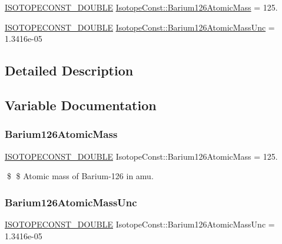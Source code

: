 \begin{DoxyCompactItemize}
\item 
\mbox{\hyperlink{group___isotope_const-_macros_ga8f45a7272ce02c0b4c65c44636ed719a}{I\+S\+O\+T\+O\+P\+E\+C\+O\+N\+S\+T\+\_\+\+D\+O\+U\+B\+LE}} \mbox{\hyperlink{group___isotope_const-_barium-_ba126_ga45bf82730a0cc1ddb43e79e016e80d28}{Isotope\+Const\+::\+Barium126\+Atomic\+Mass}} = 125.
\item 
\mbox{\hyperlink{group___isotope_const-_macros_ga8f45a7272ce02c0b4c65c44636ed719a}{I\+S\+O\+T\+O\+P\+E\+C\+O\+N\+S\+T\+\_\+\+D\+O\+U\+B\+LE}} \mbox{\hyperlink{group___isotope_const-_barium-_ba126_gaaa673860e5bdba2563afba2136b3dc9f}{Isotope\+Const\+::\+Barium126\+Atomic\+Mass\+Unc}} = 1.\+3416e-\/05
\end{DoxyCompactItemize}


\subsection{Detailed Description}


\subsection{Variable Documentation}
\mbox{\label{group___isotope_const-_barium-_ba126_ga45bf82730a0cc1ddb43e79e016e80d28}} 
\subsubsection{\texorpdfstring{Barium126\+Atomic\+Mass}{Barium126AtomicMass}}
{\footnotesize\ttfamily \mbox{\hyperlink{group___isotope_const-_macros_ga8f45a7272ce02c0b4c65c44636ed719a}{I\+S\+O\+T\+O\+P\+E\+C\+O\+N\+S\+T\+\_\+\+D\+O\+U\+B\+LE}} Isotope\+Const\+::\+Barium126\+Atomic\+Mass = 125.}

\$ \$ Atomic mass of Barium-\/126 in amu. \mbox{\label{group___isotope_const-_barium-_ba126_gaaa673860e5bdba2563afba2136b3dc9f}} 
\subsubsection{\texorpdfstring{Barium126\+Atomic\+Mass\+Unc}{Barium126AtomicMassUnc}}
{\footnotesize\ttfamily \mbox{\hyperlink{group___isotope_const-_macros_ga8f45a7272ce02c0b4c65c44636ed719a}{I\+S\+O\+T\+O\+P\+E\+C\+O\+N\+S\+T\+\_\+\+D\+O\+U\+B\+LE}} Isotope\+Const\+::\+Barium126\+Atomic\+Mass\+Unc = 1.\+3416e-\/05}

